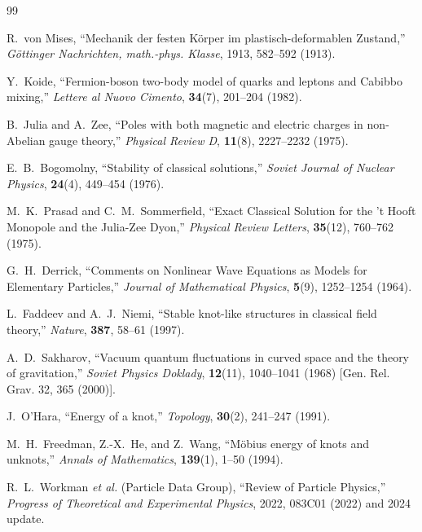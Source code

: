 \documentclass[12pt,a4paper]{article}
\begin{document}
	\begin{thebibliography}{99}
		
		R.~von Mises, 
		``Mechanik der festen Körper im plastisch-deformablen Zustand,''
		\textit{Göttinger Nachrichten, math.-phys. Klasse}, 1913, 582--592 (1913).
		
		Y.~Koide, 
		``Fermion-boson two-body model of quarks and leptons and Cabibbo mixing,''
		\textit{Lettere al Nuovo Cimento}, \textbf{34}(7), 201--204 (1982).
		
		B.~Julia and A.~Zee, 
		``Poles with both magnetic and electric charges in non-Abelian gauge theory,''
		\textit{Physical Review D}, \textbf{11}(8), 2227--2232 (1975).
		
		E.~B.~Bogomolny, 
		``Stability of classical solutions,''
		\textit{Soviet Journal of Nuclear Physics}, \textbf{24}(4), 449--454 (1976).
		
		M.~K.~Prasad and C.~M.~Sommerfield, 
		``Exact Classical Solution for the 't Hooft Monopole and the Julia-Zee Dyon,''
		\textit{Physical Review Letters}, \textbf{35}(12), 760--762 (1975).
		
		G.~H.~Derrick, 
		``Comments on Nonlinear Wave Equations as Models for Elementary Particles,''
		\textit{Journal of Mathematical Physics}, \textbf{5}(9), 1252--1254 (1964).
		
		L.~Faddeev and A.~J.~Niemi, 
		``Stable knot-like structures in classical field theory,''
		\textit{Nature}, \textbf{387}, 58--61 (1997).
		
		A.~D.~Sakharov, 
		``Vacuum quantum fluctuations in curved space and the theory of gravitation,''
		\textit{Soviet Physics Doklady}, \textbf{12}(11), 1040--1041 (1968) [Gen. Rel. Grav. 32, 365 (2000)].
		
		J.~O'Hara, 
		``Energy of a knot,''
		\textit{Topology}, \textbf{30}(2), 241--247 (1991).
		
		M.~H.~Freedman, Z.-X.~He, and Z.~Wang, 
		``Möbius energy of knots and unknots,''
		\textit{Annals of Mathematics}, \textbf{139}(1), 1--50 (1994).
		
		R.~L.~Workman \textit{et al.} (Particle Data Group),
		``Review of Particle Physics,''
		\textit{Progress of Theoretical and Experimental Physics}, 2022, 083C01 (2022) and 2024 update.
		

\end{thebibliography}
\end{document}
